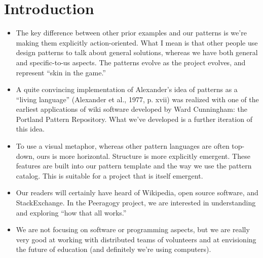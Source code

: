 \section{Introduction}

\begin{itemize}
\item The key difference between other prior examples and our
patterns is we're making them explicitly action-oriented.  What I mean
is that other people use design patterns to talk about general
solutions, whereas we have both general and specific-to-us aspects.
The patterns evolve as the project evolves, and represent ``skin in the game.''
\item A quite convincing implementation of Alexander’s idea of patterns as a “living language” (Alexander et
al., 1977, p. xvii) was realized with one of the earliest applications of wiki
software developed by Ward Cunningham: the Portland Pattern Repository.
What we've developed is a further iteration of this idea.
\item To use a visual metaphor, whereas other pattern languages are often top-down,
ours is more horizontal.  Structure is more explicitly emergent.  These features are built
into our pattern template and the way we use the pattern catalog.  This is suitable for a project
that is itself emergent.
\item Our readers will certainly have heard of Wikipedia, open source
software, and StackExchange.  In the Peeragogy project, we are interested in
understanding and exploring ``how that all works.''
\item We are not focusing on software or programming aspects, but we
are really very good at working with distributed teams of volunteers and
at envisioning the future of education (and definitely we're using
computers).
\end{itemize}